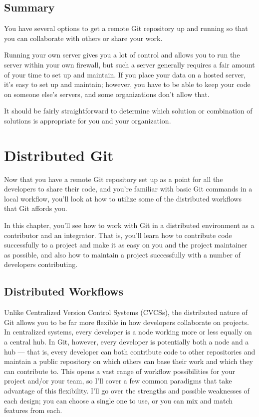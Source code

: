 \documentclass[a4paper]{book}
\newcommand{\chap}[1]{\newpage\thispagestyle{empty}\chapter{#1}\label{chap:\thechapter}}
\begin{document}
\section{Summary}

You have several options to get a remote Git repository up and running so that you can collaborate with others or share your work.

Running your own server gives you a lot of control and allows you to run the server within your own firewall, but such a server generally requires a fair amount of your time to set up and maintain. If you place your data on a hosted server, it's easy to set up and maintain; however, you have to be able to keep your code on someone else's servers, and some organizations don't allow that.

It should be fairly straightforward to determine which solution or combination of solutions is appropriate for you and your organization.

\chap{Distributed Git}

Now that you have a remote Git repository set up as a point for all the developers to share their code, and you're familiar with basic Git commands in a local workflow, you'll look at how to utilize some of the distributed workflows that Git affords you.

In this chapter, you'll see how to work with Git in a distributed environment as a contributor and an integrator. That is, you'll learn how to contribute code successfully to a project and make it as easy on you and the project maintainer as possible, and also how to maintain a project successfully with a number of developers contributing.

\section{Distributed Workflows}

Unlike Centralized Version Control Systems (CVCSs), the distributed nature of Git allows you to be far more flexible in how developers collaborate on projects. In centralized systems, every developer is a node working more or less equally on a central hub. In Git, however, every developer is potentially both a node and a hub --- that is, every developer can both contribute code to other repositories and maintain a public repository on which others can base their work and which they can contribute to. This opens a vast range of workflow possibilities for your project and/or your team, so I'll cover a few common paradigms that take advantage of this flexibility. I'll go over the strengths and possible weaknesses of each design; you can choose a single one to use, or you can mix and match features from each.
\end{document}
